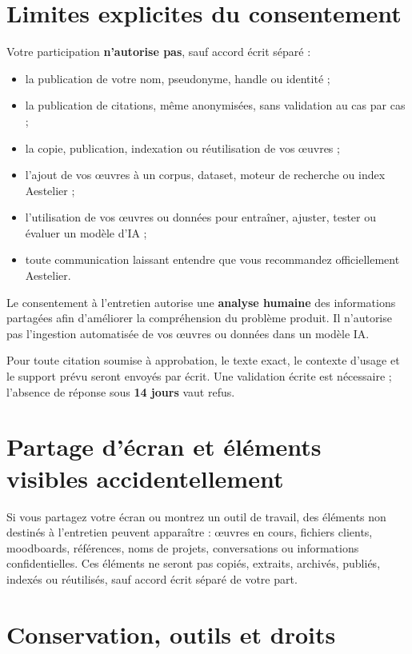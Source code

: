 \documentclass[10pt,a4paper]{article}
\begin{document}
\newpage

\section{Limites explicites du consentement}

Votre participation \textbf{n'autorise pas}, sauf accord écrit séparé :

\begin{itemize}
  \item la publication de votre nom, pseudonyme, handle ou identité ;
  \item la publication de citations, même anonymisées, sans validation au cas par cas ;
  \item la copie, publication, indexation ou réutilisation de vos œuvres ;
  \item l'ajout de vos œuvres à un corpus, dataset, moteur de recherche ou index Aestelier ;
  \item l'utilisation de vos œuvres ou données pour entraîner, ajuster, tester ou évaluer un modèle d'IA ;
  \item toute communication laissant entendre que vous recommandez officiellement Aestelier.
\end{itemize}

Le consentement à l'entretien autorise une \textbf{analyse humaine} des informations partagées afin d'améliorer la compréhension du problème produit. Il n'autorise pas l'ingestion automatisée de vos œuvres ou données dans un modèle IA.

Pour toute citation soumise à approbation, le texte exact, le contexte d'usage et le support prévu seront envoyés par écrit. Une validation écrite est nécessaire ; l'absence de réponse sous \textbf{14 jours} vaut refus.

\section{Partage d'écran et éléments visibles accidentellement}

Si vous partagez votre écran ou montrez un outil de travail, des éléments non destinés à l'entretien peuvent apparaître : œuvres en cours, fichiers clients, moodboards, références, noms de projets, conversations ou informations confidentielles. Ces éléments ne seront pas copiés, extraits, archivés, publiés, indexés ou réutilisés, sauf accord écrit séparé de votre part.

\section{Conservation, outils et droits}
\end{document}
